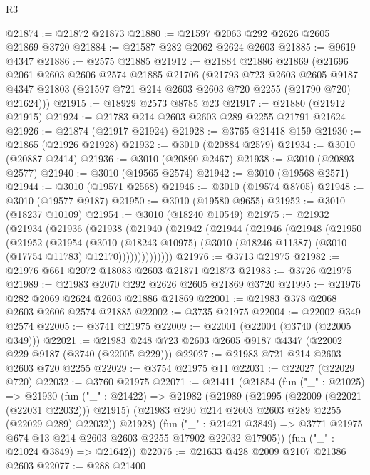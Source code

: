 \begin{lexlean}{R3}
\begin{coremodule}
@21874 := @21872 @21873
@21880 := @21597 @2063 @292 @2626 @2605 @21869 @3720
@21884 := @21587 @282 @2062 @2624 @2603
@21885 := @9619 @4347
@21886 := @2575 @21885
@21912 := @21884
    @21886
    @21869
    (@21696
      @2061
      @2603
      @2606
      @2574
      @21885
      @21706
      (@21793
        @723
        @2603
        @2605
        @9187
        @4347
        @21803
        (@21597 @721 @214 @2603 @2603 @720 @2255 (@21790 @720) @21624)))
@21915 := @18929 @2573 @8785 @23
@21917 := @21880 (@21912 @21915)
@21924 := @21783 @214 @2603 @2603 @289 @2255 @21791 @21624
@21926 := @21874 (@21917 @21924)
@21928 := @3765 @21418 @159
@21930 := @21865 (@21926 @21928)
@21932 := @3010 (@20884 @2579)
@21934 := @3010 (@20887 @2414)
@21936 := @3010 (@20890 @2467)
@21938 := @3010 (@20893 @2577)
@21940 := @3010 (@19565 @2574)
@21942 := @3010 (@19568 @2571)
@21944 := @3010 (@19571 @2568)
@21946 := @3010 (@19574 @8705)
@21948 := @3010 (@19577 @9187)
@21950 := @3010 (@19580 @9655)
@21952 := @3010 (@18237 @10109)
@21954 := @3010 (@18240 @10549)
@21975 := @21932
    (@21934
      (@21936
        (@21938
          (@21940
            (@21942
              (@21944
                (@21946
                  (@21948
                    (@21950
                      (@21952
                        (@21954
                          (@3010
                            (@18243 @10975)
                            (@3010 (@18246 @11387) (@3010 (@17754 @11783) @12170))))))))))))))
@21976 := @3713 @21975
@21982 := @21976 @661 @2072 @18083 @2603 @21871 @21873
@21983 := @3726 @21975
@21989 := @21983 @2070 @292 @2626 @2605 @21869 @3720
@21995 := @21976 @282 @2069 @2624 @2603 @21886 @21869
@22001 := @21983 @378 @2068 @2603 @2606 @2574 @21885
@22002 := @3735 @21975
@22004 := @22002 @349 @2574
@22005 := @3741 @21975
@22009 := @22001 (@22004 (@3740 (@22005 @349)))
@22021 := @21983 @248 @723 @2603 @2605 @9187 @4347 (@22002 @229 @9187 (@3740 (@22005 @229)))
@22027 := @21983 @721 @214 @2603 @2603 @720 @2255
@22029 := @3754 @21975 @11
@22031 := @22027 (@22029 @720)
@22032 := @3760 @21975
@22071 := @21411
    (@21854
      (fun ("_" : @21025) =>
      @21930
        (fun ("_" : @21422) =>
        @21982
          (@21989
            (@21995 (@22009 (@22021 (@22031 @22032))) @21915)
            (@21983 @290 @214 @2603 @2603 @289 @2255 (@22029 @289) @22032))
          @21928)
        (fun ("_" : @21421 @3849) =>
        @3771 @21975 @674 @13 @214 @2603 @2603 @2255 @17902 @22032 @17905))
      (fun ("_" : @21024 @3849) => @21642))
@22076 := @21633 @428 @2009 @2107 @21386 @2603
@22077 := @288 @21400

\end{coremodule}
\end{lexlean}
